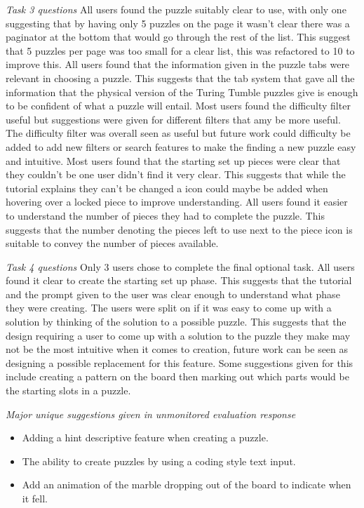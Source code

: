 \documentclass{l4proj}
\begin{document}
\emph{Task 3 questions}
All users found the puzzle suitably clear to use, with only one suggesting that by having only 5 puzzles on the page it wasn't clear there was a paginator at the bottom that would go through the rest of the list. This suggest that 5 puzzles per page was too small for a clear list, this was refactored to 10 to improve this. All users found that the information given in the puzzle tabs were relevant in choosing a puzzle. This suggests that the tab system that gave all the information that the physical version of the Turing Tumble puzzles give is enough to be confident of what a puzzle will entail. Most users found the difficulty filter useful but suggestions were given for different filters that amy be more useful. The difficulty filter was overall seen as useful but future work could difficulty be added to add new filters or search features to make the finding a new puzzle easy and intuitive. Most users found that the starting set up pieces were clear that they couldn't be one user didn't find it very clear. This suggests that while the tutorial explains they can't be changed a icon could maybe be added when hovering over a locked piece to improve understanding. All users found it easier to understand the number of pieces they had to complete the puzzle. This suggests that the number denoting the pieces left to use next to the piece icon is suitable to convey the number of pieces available.

\emph{Task 4 questions}
Only 3 users chose to complete the final optional task. All users found it clear to create the starting set up phase. This suggests that the tutorial and the prompt given to the user was clear enough to understand what phase they were creating. The users were split on if it was easy to come up with a solution by thinking of the solution to a possible puzzle. This suggests that the design requiring a user to come up with a solution to the puzzle they make may not be the most intuitive when it comes to creation, future work can be seen as designing a possible replacement for this feature. Some suggestions given for this include creating a pattern on the board then marking out which parts would be the starting slots in a puzzle.

\emph{Major unique suggestions given in unmonitored evaluation response}
\begin{itemize}
    \item Adding a hint descriptive feature when creating a puzzle.
    \item The ability to create puzzles by using a coding style text input.
    \item Add an animation of the marble dropping out of the board to indicate when it fell.
\end{itemize}
\end{document}

